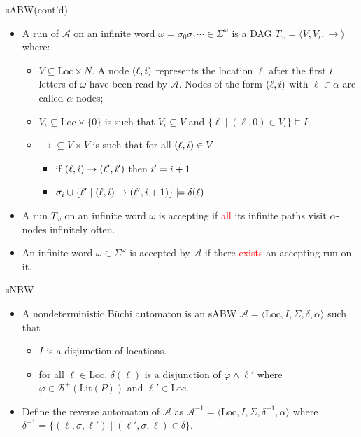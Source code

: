 \documentclass[12pt]{beamer}
\begin{document}
\begin{frame}{sABW(cont'd)}
	\begin{itemize}
		\item A run of $\mathcal{A}$ on an infinite word $\omega = \sigma_{0}\sigma_{1}\cdots \in \Sigma^{\omega}$ is a DAG $T_{\omega} = \langle V, V_{\iota}, \to \rangle$ where:
		\begin{itemize}
			\item $V \subseteq \text{Loc} \times N$. A node $(\ell, \mathnormal{i})$ represents the location $\ell$ after the first $\mathnormal{i}$ letters of $\omega$ have been read by $\mathcal{A}$. Nodes of the form $(\ell, \mathnormal{i})$ with 	$\ell \in \alpha$ are called $\alpha$-nodes;
			\item $V_{\iota} \subseteq \text{Loc} \times \{0\}$ is such that $V_{\iota} \subseteq V$ and $\{\ell \mid (\ell, 0) \in V_{\iota}\} \models I$;
			\item $\to \subseteq V \times V$ is such that for all $(\ell, \mathnormal{i}) \in V$
				\begin{itemize}
					\item if $(\ell, \mathnormal{i}) \to (\ell', \mathnormal{i}')$ then $\mathnormal{i}' = \mathnormal{i} + 1$
					\item $\sigma_{i} \cup \{\ell' \mid (\ell, \mathnormal{i}) \to (\ell', \mathnormal{i} + 1)\} \models \delta(\ell)$
				\end{itemize}
		\end{itemize}
		\item A run $T_{\omega}$ on an infinite word $\omega$ is accepting if \textcolor{red}{all} its infinite paths visit $\alpha$-nodes infinitely often.
		\item An infinite word $\omega \in \Sigma^{\omega}$ is accepted by $\mathcal{A}$ if there \textcolor{red}{exists} an accepting run on it.
	\end{itemize}
\end{frame}

\begin{frame}{sNBW}
	\begin{itemize}
		\item A nondeterministic Büchi automaton is an sABW $\mathcal{A} = \langle \text{Loc}, I, \Sigma, \delta, \alpha \rangle$ such that
		\begin{itemize}
			\item $I$ is a disjunction of locations.
			\item for all $\ell \in \text{Loc}$, $\delta(\ell)$ is a disjunction of $\varphi \land \ell'$ where $\varphi \in \mathcal{B}^{+}(\text{Lit}(P))$ and $ \ell' \in \text{Loc}$.
		\end{itemize}
		\item Define the reverse automaton of $\mathcal{A}$ as $\mathcal{A}^{-1} = \langle \text{Loc}, I, \Sigma, \delta^{-1}, \alpha \rangle$ where $\delta^{-1} = \{(\ell, \sigma, \ell') \mid (\ell', \sigma, \ell) \in \delta\}$.
	\end{itemize}
\end{frame}
\end{document}
